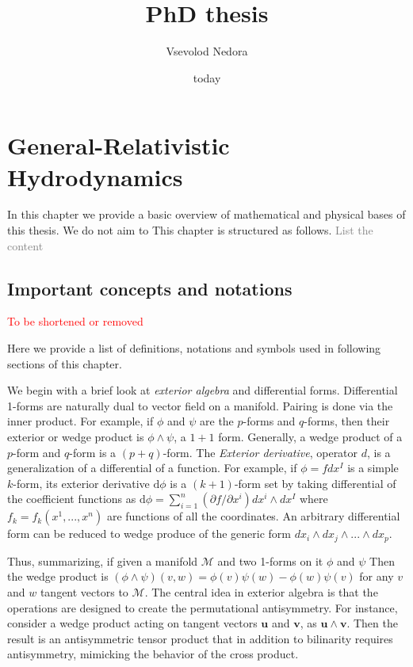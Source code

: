 \documentclass[11pt,a4paper,headinclude=true,DIV=14,BCOR=8mm,chapterprefix,listof=totoc,twoside,openright,abstracton]{scrbook}
\title{PhD thesis}
\author{Vsevolod Nedora}
\date{today}
\newcommand{\red}[1]{\textcolor{red}{#1}}
\newcommand{\gray}[1]{\textcolor{gray}{#1}}
\begin{document}
    
    \maketitle


\chapter{General-Relativistic Hydrodynamics}

In this chapter we provide a basic overview of mathematical and physical bases of this thesis. We do not aim to This chapter is structured as follows. \gray{List the content}


\section{Important concepts and notations}
\red{To be shortened or removed}

Here we provide a list of definitions, notations and symbols used in following sections of this chapter. 

We begin with a brief look at \textit{exterior algebra} and differential forms. Differential 1-forms are naturally dual to vector field on a manifold. Pairing is done via the inner product. For example, if $\phi$ and $\psi$ are the $p$-forms and $q$-forms, then their exterior or wedge product is $\phi\wedge\psi$, a $1+1$ form. Generally, a wedge product of a$p$-form and $q$-form is a $(p+q)$-form. The \textit{Exterior derivative}, operator $d$, is a generalization of a differential of a function. For example, if $\phi=fdx^I$ is a simple $k$-form, its exterior derivative $\text{d}\phi$ is a $(k+1)$-form set by taking differential of the coefficient functions as $\text{d}\phi = \sum_{i=1}^n (\partial f / \partial x^i) dx^i \wedge dx^I$ where $f_k=f_k(x^1,...,x^n)$ are functions of all the coordinates. An arbitrary differential form can be reduced to wedge produce of the generic form $ dx_i\wedge dx_j \wedge...\wedge dx_p $. 

Thus, summarizing, if given a manifold $\mathcal{M}$ and two 1-forms on it $\phi$ and $\psi$ Then the wedge product is $(\phi\wedge\psi)(v,w)=\phi(v)\psi(w) - \phi(w)\psi(v)$ for any $v$ and $w$ tangent vectors to $\mathcal{M}$. The central idea in exterior algebra is that the operations are designed to create the permutational antisymmetry. For instance, consider a wedge product acting on tangent vectors $\boldsymbol{u}$ and $\boldsymbol{v}$, as  $\boldsymbol{u}\wedge\boldsymbol{v}$. Then the result is an antisymmetric tensor product that in addition to bilinarity requires antisymmetry, mimicking the behavior of the cross product. 
\end{document}
